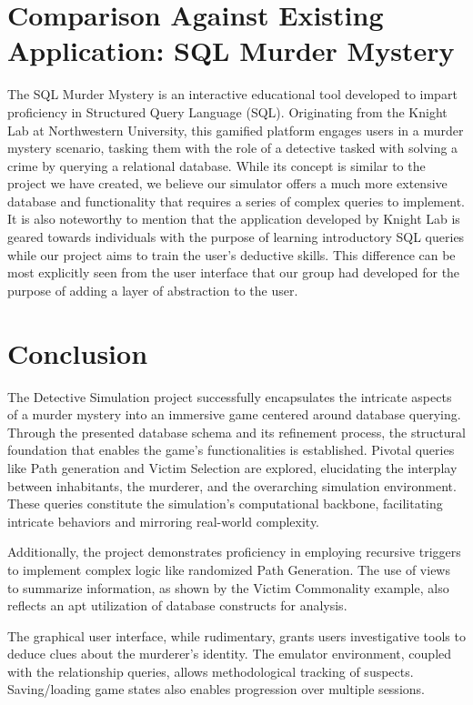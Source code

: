 \documentclass{article}
\begin{document}
\section{Comparison Against Existing Application: SQL Murder Mystery}
The SQL Murder Mystery is an interactive educational tool developed to impart proficiency in Structured Query Language (SQL).\cite{knight_lab_sql_mystery} Originating from the Knight Lab at Northwestern University, this gamified platform engages users in a murder mystery scenario, tasking them with the role of a detective tasked with solving a crime by querying a relational database. While its concept is similar to the project we have created, we believe our simulator offers a much more extensive database and functionality that requires a series of complex queries to implement. It is also noteworthy to mention that the application developed by Knight Lab is geared towards individuals with the purpose of learning introductory SQL queries while our project aims to train the user's deductive skills. This difference can be most explicitly seen from the user interface that our group had developed for the purpose of adding a layer of abstraction to the user.

\section{Conclusion}
The Detective Simulation project successfully encapsulates the intricate aspects of a murder mystery into an immersive game centered around database querying. Through the presented database schema and its refinement process, the structural foundation that enables the game's functionalities is established. Pivotal queries like Path generation and Victim Selection are explored, elucidating the interplay between inhabitants, the murderer, and the overarching simulation environment. These queries constitute the simulation's computational backbone, facilitating intricate behaviors and mirroring real-world complexity.

Additionally, the project demonstrates proficiency in employing recursive triggers to implement complex logic like randomized Path Generation. The use of views to summarize information, as shown by the Victim Commonality example, also reflects an apt utilization of database constructs for analysis.

The graphical user interface, while rudimentary, grants users investigative tools to deduce clues about the murderer's identity. The emulator environment, coupled with the relationship queries, allows methodological tracking of suspects. Saving/loading game states also enables progression over multiple sessions.
\end{document}
